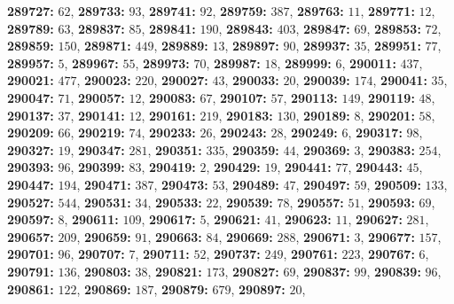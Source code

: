 \textsf{\bfseries 289727:} $62$, \textsf{\bfseries 289733:} $93$, \textsf{\bfseries 289741:} $92$, \textsf{\bfseries 289759:} $387$, \textsf{\bfseries 289763:} $11$, \textsf{\bfseries 289771:} $12$, \textsf{\bfseries 289789:} $63$, \textsf{\bfseries 289837:} $85$, \textsf{\bfseries 289841:} $190$, \textsf{\bfseries 289843:} $403$, \textsf{\bfseries 289847:} $69$, \textsf{\bfseries 289853:} $72$, \textsf{\bfseries 289859:} $150$, \textsf{\bfseries 289871:} $449$, \textsf{\bfseries 289889:} $13$, \textsf{\bfseries 289897:} $90$, \textsf{\bfseries 289937:} $35$, \textsf{\bfseries 289951:} $77$, \textsf{\bfseries 289957:} $5$, \textsf{\bfseries 289967:} $55$, \textsf{\bfseries 289973:} $70$, \textsf{\bfseries 289987:} $18$, \textsf{\bfseries 289999:} $6$, \textsf{\bfseries 290011:} $437$, \textsf{\bfseries 290021:} $477$, \textsf{\bfseries 290023:} $220$, \textsf{\bfseries 290027:} $43$, \textsf{\bfseries 290033:} $20$, \textsf{\bfseries 290039:} $174$, \textsf{\bfseries 290041:} $35$, \textsf{\bfseries 290047:} $71$, \textsf{\bfseries 290057:} $12$, \textsf{\bfseries 290083:} $67$, \textsf{\bfseries 290107:} $57$, \textsf{\bfseries 290113:} $149$, \textsf{\bfseries 290119:} $48$, \textsf{\bfseries 290137:} $37$, \textsf{\bfseries 290141:} $12$, \textsf{\bfseries 290161:} $219$, \textsf{\bfseries 290183:} $130$, \textsf{\bfseries 290189:} $8$, \textsf{\bfseries 290201:} $58$, \textsf{\bfseries 290209:} $66$, \textsf{\bfseries 290219:} $74$, \textsf{\bfseries 290233:} $26$, \textsf{\bfseries 290243:} $28$, \textsf{\bfseries 290249:} $6$, \textsf{\bfseries 290317:} $98$, \textsf{\bfseries 290327:} $19$, \textsf{\bfseries 290347:} $281$, \textsf{\bfseries 290351:} $335$, \textsf{\bfseries 290359:} $44$, \textsf{\bfseries 290369:} $3$, \textsf{\bfseries 290383:} $254$, \textsf{\bfseries 290393:} $96$, \textsf{\bfseries 290399:} $83$, \textsf{\bfseries 290419:} $2$, \textsf{\bfseries 290429:} $19$, \textsf{\bfseries 290441:} $77$, \textsf{\bfseries 290443:} $45$, \textsf{\bfseries 290447:} $194$, \textsf{\bfseries 290471:} $387$, \textsf{\bfseries 290473:} $53$, \textsf{\bfseries 290489:} $47$, \textsf{\bfseries 290497:} $59$, \textsf{\bfseries 290509:} $133$, \textsf{\bfseries 290527:} $544$, \textsf{\bfseries 290531:} $34$, \textsf{\bfseries 290533:} $22$, \textsf{\bfseries 290539:} $78$, \textsf{\bfseries 290557:} $51$, \textsf{\bfseries 290593:} $69$, \textsf{\bfseries 290597:} $8$, \textsf{\bfseries 290611:} $109$, \textsf{\bfseries 290617:} $5$, \textsf{\bfseries 290621:} $41$, \textsf{\bfseries 290623:} $11$, \textsf{\bfseries 290627:} $281$, \textsf{\bfseries 290657:} $209$, \textsf{\bfseries 290659:} $91$, \textsf{\bfseries 290663:} $84$, \textsf{\bfseries 290669:} $288$, \textsf{\bfseries 290671:} $3$, \textsf{\bfseries 290677:} $157$, \textsf{\bfseries 290701:} $96$, \textsf{\bfseries 290707:} $7$, \textsf{\bfseries 290711:} $52$, \textsf{\bfseries 290737:} $249$, \textsf{\bfseries 290761:} $223$, \textsf{\bfseries 290767:} $6$, \textsf{\bfseries 290791:} $136$, \textsf{\bfseries 290803:} $38$, \textsf{\bfseries 290821:} $173$, \textsf{\bfseries 290827:} $69$, \textsf{\bfseries 290837:} $99$, \textsf{\bfseries 290839:} $96$, \textsf{\bfseries 290861:} $122$, \textsf{\bfseries 290869:} $187$, \textsf{\bfseries 290879:} $679$, \textsf{\bfseries 290897:} $20$, 
